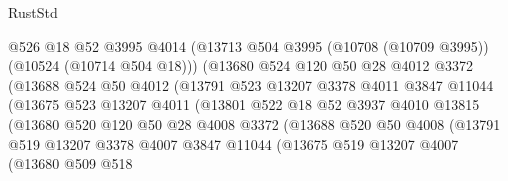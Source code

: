 \begin{lexlean}{RustStd}
\begin{coremodule}
                            @526
                            @18
                            @52
                            @3995
                            @4014
                            (@13713 @504 @3995 (@10708 (@10709 @3995)) (@10524 (@10714 @504 @18)))
                            (@13680
                              @524
                              @120
                              @50
                              @28
                              @4012
                              @3372
                              (@13688
                                @524
                                @50
                                @4012
                                (@13791
                                  @523
                                  @13207
                                  @3378
                                  @4011
                                  @3847
                                  @11044
                                  (@13675
                                    @523
                                    @13207
                                    @4011
                                    (@13801
                                      @522
                                      @18
                                      @52
                                      @3937
                                      @4010
                                      @13815
                                      (@13680
                                        @520
                                        @120
                                        @50
                                        @28
                                        @4008
                                        @3372
                                        (@13688
                                          @520
                                          @50
                                          @4008
                                          (@13791
                                            @519
                                            @13207
                                            @3378
                                            @4007
                                            @3847
                                            @11044
                                            (@13675
                                              @519
                                              @13207
                                              @4007
                                              (@13680
                                                @509
                                                @518

\end{coremodule}
\end{lexlean}
